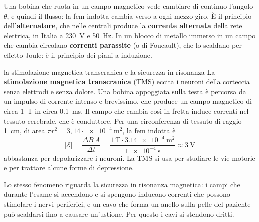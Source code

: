 Una bobina che ruota in un campo magnetico vede cambiare di continuo l'angolo $\theta$, e quindi il flusso: la fem indotta cambia verso a ogni mezzo giro. È il principio dell'\textbf{alternatore}, che nelle centrali produce la \textbf{corrente alternata} della rete elettrica, in Italia a \SI{230}{\volt} e \SI{50}{\hertz}. In un blocco di metallo immerso in un campo che cambia circolano \textbf{correnti parassite} (o di Foucault), che lo scaldano per effetto Joule: è il principio dei piani a induzione.

\begin{applicazione}{la stimolazione magnetica transcranica e la sicurezza in risonanza}
La \textbf{stimolazione magnetica transcranica} (TMS) eccita i neuroni della corteccia senza elettrodi e senza dolore. Una bobina appoggiata sulla testa è percorsa da un impulso di corrente intenso e brevissimo, che produce un campo magnetico di circa \SI{1}{\tesla} in circa \SI{0,1}{\milli\second}. Il campo che cambia così in fretta induce correnti nel tessuto cerebrale, che è conduttore. Per una circonferenza di tessuto di raggio \SI{1}{\centi\metre}, di area $\pi r^{2} = 3{,}14 \cdot \SI{e-4}{\metre\squared}$, la fem indotta è
\[
  |\mathcal E| = \frac{\Delta B\,A}{\Delta t} = \frac{\SI{1}{\tesla} \cdot \SI{3,14e-4}{\metre\squared}}{\SI{1e-4}{\second}} \approx \SI{3}{\volt}
\]
abbastanza per depolarizzare i neuroni. La TMS si usa per studiare le vie motorie e per trattare alcune forme di depressione.

Lo stesso fenomeno riguarda la sicurezza in risonanza magnetica: i campi che durante l'esame si accendono e si spengono inducono correnti che possono stimolare i nervi periferici, e un cavo che forma un anello sulla pelle del paziente può scaldarsi fino a causare un'ustione. Per questo i cavi si stendono dritti.
\end{applicazione}

\riepilogoformule
